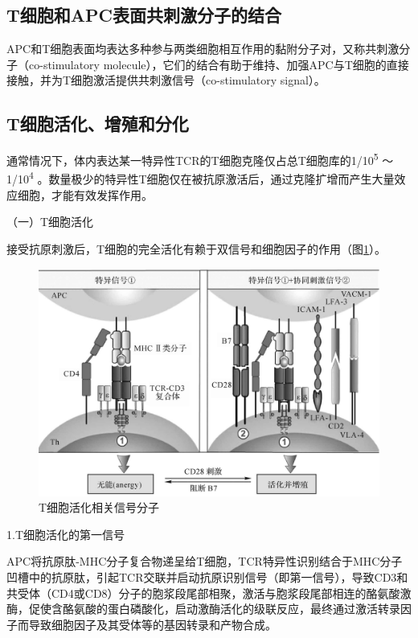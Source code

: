 \subsection{T细胞和APC表面共刺激分子的结合}

APC和T细胞表面均表达多种参与两类细胞相互作用的黏附分子对，又称共刺激分子（co-stimulatory
molecule），它们的结合有助于维持、加强APC与T细胞的直接接触，并为T细胞激活提供共刺激信号（co-stimulatory
signal）。


\subsection{T细胞活化、增殖和分化}

通常情况下，体内表达某一特异性TCR的T细胞克隆仅占总T细胞库的1/10\textsuperscript{5}
～1/10\textsuperscript{4}
。数量极少的特异性T细胞仅在被抗原激活后，通过克隆扩增而产生大量效应细胞，才能有效发挥作用。

（一）T细胞活化

接受抗原刺激后，T细胞的完全活化有赖于双信号和细胞因子的作用（图\ref{fig9-11}）。

\begin{figure}[!htbp]
 \centering
 \includegraphics{./images/Image00137.jpg}
 \captionsetup{justification=centering}
 \caption{T细胞活化相关信号分子}
 \label{fig9-11}
  \end{figure} 

1.T细胞活化的第一信号

APC将抗原肽-MHC分子复合物递呈给T细胞，TCR特异性识别结合于MHC分子凹槽中的抗原肽，引起TCR交联并启动抗原识别信号（即第一信号），导致CD3和共受体（CD4或CD8）分子的胞浆段尾部相聚，激活与胞浆段尾部相连的酪氨酸激酶，促使含酪氨酸的蛋白磷酸化，启动激酶活化的级联反应，最终通过激活转录因子而导致细胞因子及其受体等的基因转录和产物合成。

